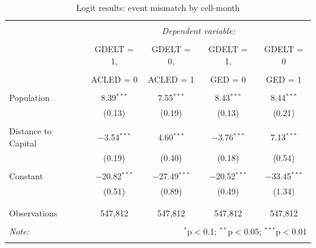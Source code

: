 \documentclass[hidelinks]{article}
\begin{document}
\begin{table}[!htbp] \centering 
  \caption{} 
  \label{} 
\begin{tabular}{@{\extracolsep{5pt}}lcccc} 
\\[-1.8ex]\hline 
\hline \\[-1.8ex] 
 & \multicolumn{4}{c}{\textit{Dependent variable:}} \\ 
\cline{2-5} 
\\[-1.8ex] & GDELT = 1, & GDELT = 0, & GDELT = 1, & GDELT = 0 \\ 
\\[-2.8ex] & ACLED = 0 & ACLED = 1 & GED = 0 & GED = 1 \\ 
\hline \\[-1.8ex] 
Population & 8.39$^{***}$ & 7.55$^{***}$ & 8.43$^{***}$ & 8.44$^{***}$ \\ 
  & (0.13) & (0.19) & (0.13) & (0.21) \\ 
  & & & & \\ 
Distance to Capital & $-$3.54$^{***}$ & 4.60$^{***}$ & $-$3.76$^{***}$ & 7.13$^{***}$ \\ 
  & (0.19) & (0.40) & (0.18) & (0.54) \\ 
  & & & & \\ 
 Constant & $-$20.82$^{***}$ & $-$27.49$^{***}$ & $-$20.52$^{***}$ & $-$33.45$^{***}$ \\ 
  & (0.51) & (0.89) & (0.49) & (1.34) \\ 
  & & & & \\ 
\hline \\[-1.8ex] 
Observations & 547,812 & 547,812 & 547,812 & 547,812 \\ 
\hline 
\hline \\[-1.8ex] 
\textit{Note:}  & \multicolumn{4}{r}{$^{*}$p$<$0.1; $^{**}$p$<$0.05; $^{***}$p$<$0.01} \\ 
\normalsize 
\end{tabular} 
\caption{Logit results: event mismatch by cell-month}
\end{table} 

\vfill
\end{document}
